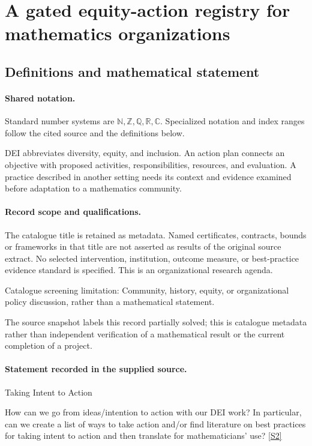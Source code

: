 \documentclass[11pt]{article}
\newcommand{\sref}[2]{\hyperlink{source:#1:#2}{[S#2]}}
\begin{document}
\section{A gated equity-action registry for mathematics organizations}\label{statement}

\subsection{Definitions and mathematical statement}

\paragraph{Shared notation.}Standard number systems are $\mathbb N,\mathbb Z,\mathbb Q,\mathbb R,\mathbb C$. Specialized notation and index ranges follow the cited source and the definitions below.


DEI abbreviates diversity, equity, and inclusion. An action plan connects an objective with proposed activities, responsibilities, resources, and evaluation. A practice described in another setting needs its context and evidence examined before adaptation to a mathematics community.
\paragraph{Record scope and qualifications.}
The catalogue title is retained as metadata. Named certificates, contracts, bounds or frameworks in that title are not asserted as results of the original source extract.
No selected intervention, institution, outcome measure, or best-practice evidence standard is specified. This is an organizational research agenda.

Catalogue screening limitation: Community, history, equity, or organizational policy discussion, rather than a mathematical statement.

The source snapshot labels this record partially solved; this is catalogue metadata rather than independent verification of a mathematical result or the current completion of a project.
\paragraph{Statement recorded in the supplied source.}
Taking Intent to Action

How can we go from ideas/intention to action with our DEI work? In particular, can we create a list of ways to take action and/or find literature on best practices for taking intent to action and then translate for mathematicians' use? \sref{statement}{2}
\end{document}
